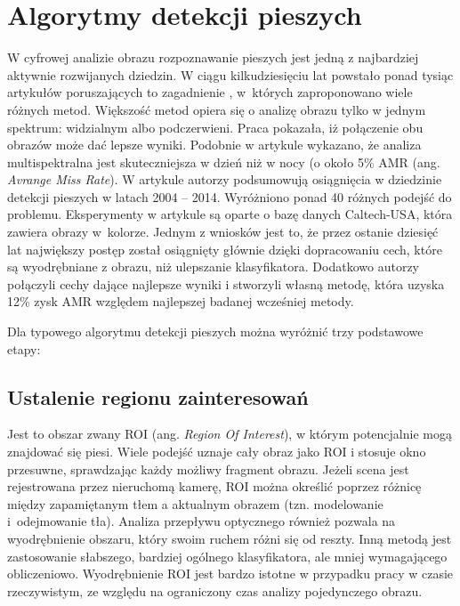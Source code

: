 \chapter{Algorytmy detekcji pieszych}
\label{cha:algoDetPiesz}

W cyfrowej analizie obrazu rozpoznawanie pieszych jest jedną z najbardziej aktywnie rozwijanych dziedzin.
W ciągu kilkudziesięciu lat powstało ponad tysiąc artykułów poruszających to zagadnienie \cite{zhang2015filtered}, w~których zaproponowano wiele różnych metod.
Większość metod opiera się o analizę obrazu tylko w jednym spektrum: widzialnym albo podczerwieni.
Praca \cite{hwang2015multispectral} pokazała, iż połączenie obu obrazów może dać lepsze wyniki.
Podobnie w artykule \cite{gonzalez2016pedestrian} wykazano, że analiza multispektralna jest skuteczniejsza w dzień niż w nocy (o około 5\% AMR (ang. \textit{Avrange Miss Rate}).
W artykule \cite{benenson2014ten} autorzy podsumowują osiągnięcia w dziedzinie detekcji pieszych w latach 2004 -- 2014.
Wyróżniono ponad 40 różnych podejść do problemu.
Eksperymenty w artykule są oparte o bazę danych Caltech-USA, która zawiera obrazy w~kolorze.
Jednym z wniosków jest to, że przez ostanie dziesięć lat największy postęp został osiągnięty głównie dzięki dopracowaniu cech, które są wyodrębniane z obrazu, niż ulepszanie klasyfikatora.
Dodatkowo autorzy połączyli cechy dające najlepsze wyniki i stworzyli własną metodę, która uzyska 12\% zysk AMR względem najlepszej badanej wcześniej metody.


Dla typowego algorytmu detekcji pieszych można wyróżnić trzy podstawowe etapy:

\section{Ustalenie regionu zainteresowań}

Jest to obszar zwany ROI (ang. \textit{Region Of Interest}), w którym potencjalnie mogą znajdować się piesi.
Wiele podejść uznaje cały obraz jako ROI i stosuje okno przesuwne, sprawdzając każdy możliwy fragment obrazu.
Jeżeli scena jest rejestrowana przez nieruchomą kamerę, ROI można określić poprzez różnicę między zapamiętanym tłem a aktualnym obrazem (tzn. modelowanie i~odejmowanie tła). Analiza przepływu optycznego również pozwala na wyodrębnienie obszaru, który swoim ruchem różni się od reszty. Inną metodą jest zastosowanie słabszego, bardziej ogólnego klasyfikatora, ale mniej wymagającego obliczeniowo.
Wyodrębnienie ROI jest bardzo istotne w przypadku pracy w czasie rzeczywistym, ze względu na ograniczony czas analizy pojedynczego obrazu.

